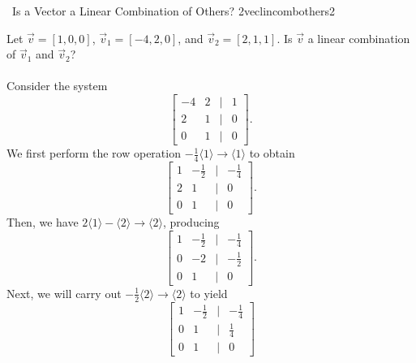         \begin{example}{\Difficulty\,\Difficulty\,\,Is a Vector a Linear Combination of Others? 2}{veclincombothers2}
        
            Let \(\vec{v}=[1,0,0]\), \(\vec{v}_1=[-4,2,0]\), and \(\vec{v}_2=[2,1,1]\). Is \(\vec{v}\) a linear combination of \(\vec{v}_1\) and \(\vec{v}_2\)?
            \\
            \\
            Consider the system
            \begin{equation*}
                \begin{bmatrix}
                    -4 & 2 & | & 1 \\
                    2 & 1 & | & 0 \\
                    0 & 1 & | & 0
                \end{bmatrix}.
            \end{equation*}
            We first perform the row operation \(-\frac{1}{4}\langle1\rangle\to\langle1\rangle\) to obtain
            \begin{equation*}
                \begin{bmatrix}
                    1 & -\frac{1}{2} & | & -\frac{1}{4} \\
                    2 & 1 & | & 0 \\
                    0 & 1 & | & 0
                \end{bmatrix}.
            \end{equation*}
            Then, we have \(2\langle1\rangle-\langle2\rangle\to\langle2\rangle\), producing
            \begin{equation*}
                \begin{bmatrix}
                    1 & -\frac{1}{2} & | & -\frac{1}{4} \\
                    0 & -2 & | & -\frac{1}{2} \\
                    0 & 1 & | & 0
                \end{bmatrix}.
            \end{equation*}
            Next, we will carry out \(-\frac{1}{2}\langle2\rangle\to\langle2\rangle\) to yield
            \begin{equation*}
                \begin{bmatrix}
                    1 & -\frac{1}{2} & | & -\frac{1}{4} \\
                    0 & 1 & | & \frac{1}{4} \\
                    0 & 1 & | & 0

\end{bmatrix}
\end{equation*}
\end{example}
